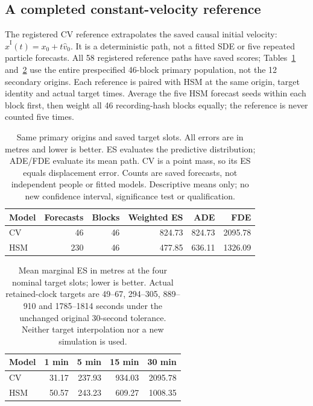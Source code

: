\FloatBarrier
\subsection{A completed constant-velocity reference}
\label{sec:inertial-primary}
The registered CV reference extrapolates the saved causal initial velocity: $\widehat x^{\mathrm{I}}(t)=x_0+t\widehat v_0$. It is a deterministic path, not a fitted SDE or five repeated particle forecasts. All 58 registered reference paths have saved scores; Tables~\ref{tab:inertial-primary} and~\ref{tab:inertial-horizons} use the entire prespecified 46-block primary population, not the 12 secondary origins. Each reference is paired with HSM at the same origin, target identity and actual target times. Average the five HSM forecast seeds within each block first, then weight all 46 recording-hash blocks equally; the reference is never counted five times.

\begin{table}[htbp]\centering\small
\caption{Same primary origins and saved target slots. All errors are in metres and lower is better. ES evaluates the predictive distribution; ADE/FDE evaluate its mean path. CV is a point mass, so its ES equals displacement error. Counts are saved forecasts, not independent people or fitted models. Descriptive means only; no new confidence interval, significance test or qualification.}\label{tab:inertial-primary}
\begin{tabular}{@{}lrrrrr@{}}\toprule
Model & Forecasts & Blocks & Weighted ES & ADE & FDE\\\midrule
CV & 46 & 46 & 824.73 & 824.73 & 2095.78\\
HSM & 230 & 46 & 477.85 & 636.11 & 1326.09\\
\bottomrule\end{tabular}\end{table}

\begin{table}[htbp]\centering\small
\caption{Mean marginal ES in metres at the four nominal target slots; lower is better. Actual retained-clock targets are 49--67, 294--305, 889--910 and 1785--1814 seconds under the unchanged original 30-second tolerance. Neither target interpolation nor a new simulation is used.}\label{tab:inertial-horizons}
\begin{tabular}{@{}lrrrr@{}}\toprule
Model & 1 min & 5 min & 15 min & 30 min\\\midrule
CV & 31.17 & 237.93 & 934.03 & 2095.78\\
HSM & 50.57 & 243.23 & 609.27 & 1008.35\\
\bottomrule\end{tabular}\end{table}

